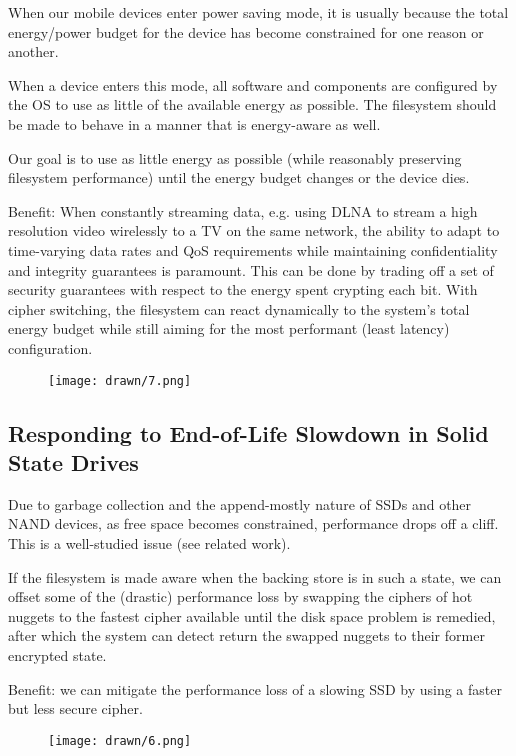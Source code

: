 When our mobile devices enter power saving mode, it is usually because the total
energy/power budget for the device has become constrained for one reason or
another.

When a device enters this mode, all software and components are configured by
the OS to use as little of the available energy as possible. The filesystem
should be made to behave in a manner that is energy-aware as well.

Our goal is to use as little energy as possible (while reasonably preserving
filesystem performance) until the energy budget changes or the device dies.

Benefit: When constantly streaming data, e.g. using DLNA to stream a high
resolution video wirelessly to a TV on the same network, the ability to adapt to
time-varying data rates and QoS requirements while maintaining confidentiality
and integrity guarantees is paramount. This can be done by trading off a set of
security guarantees with respect to the energy spent crypting each bit. With
cipher switching, the filesystem can react dynamically to the system's total
energy budget while still aiming for the most performant (least latency)
configuration.

\begin{figure}[ht]
 \centering
  \texttt{[image: drawn/7.png]}
   \caption{}\label{fig:energy-budget}
\end{figure}

\subsection{Responding to End-of-Life Slowdown in Solid State Drives}

Due to garbage collection and the append-mostly nature of SSDs and other NAND
devices, as free space becomes constrained, performance drops off a cliff. This
is a well-studied issue (see related work).

If the filesystem is made aware when the backing store is in such a state, we
can offset some of the (drastic) performance loss by swapping the ciphers of hot
nuggets to the fastest cipher available until the disk space problem is
remedied, after which the system can detect return the swapped nuggets to their
former encrypted state.

Benefit: we can mitigate the performance loss of a slowing SSD by using a faster
but less secure cipher.

\begin{figure}[ht]
 \centering
  \texttt{[image: drawn/6.png]}
   \caption{}\label{fig:eol}
\end{figure}

